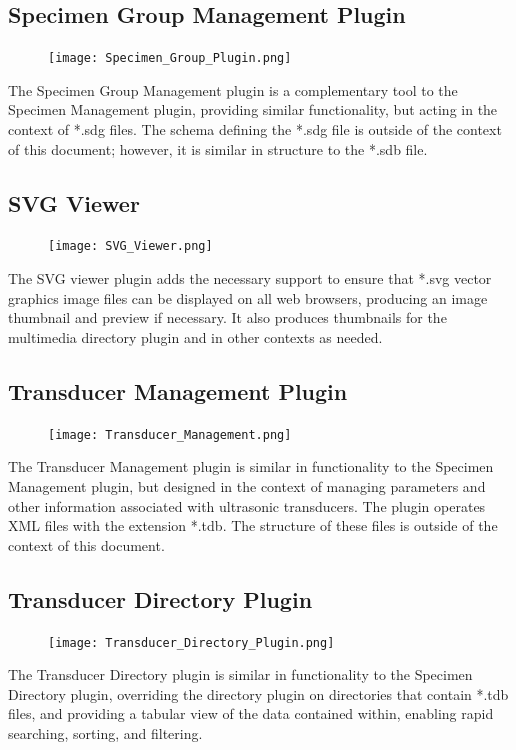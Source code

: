 \documentclass[10pt]{article}
\begin{document}
\begingroup
\setlength\intextsep{0pt}
\subsection{Specimen Group Management Plugin}
\begin{figure}
		\texttt{[image: Specimen\_Group\_Plugin.png]}
\end{figure}
The Specimen Group Management plugin is a complementary tool to the Specimen Management plugin, providing similar functionality, but acting in the context of *.sdg files.  The schema defining the *.sdg file is outside of the context of this document; however, it is similar in structure to the *.sdb file.

\endgroup


\clearpage
\begingroup
\setlength\intextsep{0pt}
\subsection{SVG Viewer}
\begin{figure}
		\texttt{[image: SVG\_Viewer.png]}
\end{figure}
The SVG viewer plugin adds the necessary support to ensure that *.svg vector graphics image files can be displayed on all web browsers, producing an image thumbnail and preview if necessary.  It also produces thumbnails for the multimedia directory plugin and in other contexts as needed.

\endgroup



\begingroup
\setlength\intextsep{0pt}
\subsection{Transducer Management Plugin}
\begin{figure}
		\texttt{[image: Transducer\_Management.png]}
\end{figure}
The Transducer Management plugin is similar in functionality to the Specimen Management plugin, but designed in the context of managing parameters and other information associated with ultrasonic transducers.  The plugin operates XML files with the extension *.tdb.  The structure of these files is outside of the context of this document.

\endgroup



\begingroup
\setlength\intextsep{0pt}
\subsection{Transducer Directory Plugin}
\begin{figure}
		\texttt{[image: Transducer\_Directory\_Plugin.png]}
\end{figure}
The Transducer Directory plugin is similar in functionality to the Specimen Directory plugin, overriding the directory plugin on directories that contain *.tdb files, and providing a tabular view of the data contained within, enabling rapid searching, sorting, and filtering.
\end{document}
